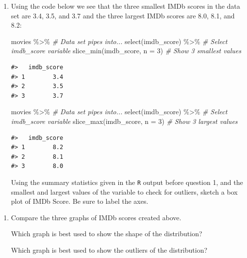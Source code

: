\documentclass[
]{report}
\newenvironment{Shaded}{\begin{snugshade}}{\end{snugshade}}
\newcommand{\AttributeTok}[1]{\textcolor[rgb]{0.77,0.63,0.00}{#1}}
\newcommand{\CommentTok}[1]{\textcolor[rgb]{0.56,0.35,0.01}{\textit{#1}}}
\newcommand{\DecValTok}[1]{\textcolor[rgb]{0.00,0.00,0.81}{#1}}
\newcommand{\FunctionTok}[1]{\textcolor[rgb]{0.00,0.00,0.00}{#1}}
\newcommand{\NormalTok}[1]{#1}
\newcommand{\SpecialCharTok}[1]{\textcolor[rgb]{0.00,0.00,0.00}{#1}}
\begin{document}
\vspace{0.4in}

\begin{enumerate}
\def\labelenumi{\arabic{enumi}.}
\setcounter{enumi}{8}
\item
  Using the code below we see that the three smallest IMDb scores in the data set are 3.4, 3.5, and 3.7 and the three largest IMDb scores are 8.0, 8.1, and 8.2:

\begin{Shaded}
\begin{Highlighting}[]
\NormalTok{movies }\SpecialCharTok{\%\textgreater{}\%} \CommentTok{\# Data set pipes into...}
  \FunctionTok{select}\NormalTok{(imdb\_score) }\SpecialCharTok{\%\textgreater{}\%} \CommentTok{\# Select imdb\_score variable}
  \FunctionTok{slice\_min}\NormalTok{(imdb\_score, }\AttributeTok{n =} \DecValTok{3}\NormalTok{)  }\CommentTok{\# Show 3 smallest values}
\end{Highlighting}
\end{Shaded}

\begin{verbatim}
#>   imdb_score
#> 1        3.4
#> 2        3.5
#> 3        3.7
\end{verbatim}

\begin{Shaded}
\begin{Highlighting}[]
\NormalTok{movies }\SpecialCharTok{\%\textgreater{}\%} \CommentTok{\# Data set pipes into...}
  \FunctionTok{select}\NormalTok{(imdb\_score) }\SpecialCharTok{\%\textgreater{}\%} \CommentTok{\# Select imdb\_score variable}
  \FunctionTok{slice\_max}\NormalTok{(imdb\_score, }\AttributeTok{n =} \DecValTok{3}\NormalTok{)  }\CommentTok{\# Show 3 largest values}
\end{Highlighting}
\end{Shaded}

\begin{verbatim}
#>   imdb_score
#> 1        8.2
#> 2        8.1
#> 3        8.0
\end{verbatim}

  Using the summary statistics given in the \texttt{R} output before question 1, and the smallest and largest values of the variable to check for outliers, sketch a box plot of IMDb Score. Be sure to label the axes.
\end{enumerate}

\vspace{1.5in}

\begin{enumerate}
\def\labelenumi{\arabic{enumi}.}
\setcounter{enumi}{9}
\item
  Compare the three graphs of IMDb scores created above.

  Which graph is best used to show the shape of the distribution?

  \vspace{0.5in}

  Which graph is best used to show the outliers of the distribution?

  \vspace{0.5in}
\end{enumerate}
\end{document}
